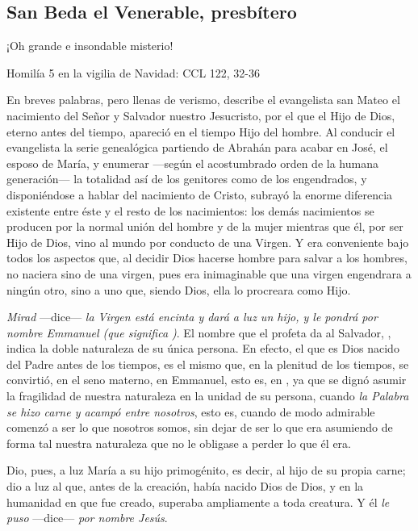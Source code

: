 \begin{body}
\begin{body}
\subsection{San Beda el Venerable, presbítero}

¡Oh grande e insondable misterio!

Homilía 5 en la vigilia de Navidad: CCL 122, 32-36

En breves palabras, pero llenas de verismo, describe el evangelista san Mateo el nacimiento del Señor y Salvador nuestro Jesucristo, por el que el Hijo de Dios, eterno antes del tiempo, apareció en el tiempo Hijo del hombre. Al conducir el evangelista la serie genealógica partiendo de Abrahán para acabar en José, el esposo de María, y enumerar ---según el acostumbrado orden de la humana generación--- la totalidad así de los genitores como de los engendrados, y disponiéndose a hablar del nacimiento de Cristo, subrayó la enorme diferencia existente entre éste y el resto de los nacimientos: los demás nacimientos se producen por la normal unión del hombre y de la mujer mientras que él, por ser Hijo de Dios, vino al mundo por conducto de una Virgen. Y era conveniente bajo todos los aspectos que, al decidir Dios hacerse hombre para salvar a los hombres, no naciera sino de una virgen, pues era inimaginable que una virgen engendrara a ningún otro, sino a uno que, siendo Dios, ella lo procreara como Hijo.

\emph{Mirad} ---dice--- \emph{la Virgen está encinta y dará a luz un hijo, y le pondrá por nombre Emmanuel (que significa )}. El nombre que el profeta da al Salvador, , indica la doble naturaleza de su única persona. En efecto, el que es Dios nacido del Padre antes de los tiempos, es el mismo que, en la plenitud de los tiempos, se convirtió, en el seno materno, en Emmanuel, esto es, en , ya que se dignó asumir la fragilidad de nuestra naturaleza en la unidad de su persona, cuando \emph{la Palabra se hizo carne y acampó entre nosotros}, esto es, cuando de modo admirable comenzó a ser lo que nosotros somos, sin dejar de ser lo que era asumiendo de forma tal nuestra naturaleza que no le obligase a perder lo que él era.

Dio, pues, a luz María a su hijo primogénito, es decir, al hijo de su propia carne; dio a luz al que, antes de la creación, había nacido Dios de Dios, y en la humanidad en que fue creado, superaba ampliamente a toda creatura. Y él \emph{le puso} ---dice--- \emph{por nombre Jesús}.


\end{body}
\end{body}
